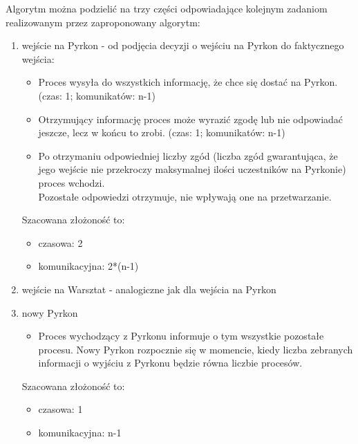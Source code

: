 \documentclass[11pt]{article}
\begin{document}
Algorytm można podzielić na trzy części odpowiadające kolejnym zadaniom realizowanym przez zaproponowany algorytm:
\begin{enumerate}
\item wejście na Pyrkon - od podjęcia decyzji o wejściu na Pyrkon do faktycznego wejścia:
\begin{itemize}
\item Proces wysyła do wszystkich informację, że chce się dostać na Pyrkon. (czas: 1; komunikatów: n-1)
\item Otrzymujący informację proces może wyrazić zgodę lub nie odpowiadać jeszcze, lecz w końcu to zrobi. (czas: 1; komunikatów: n-1)
\item Po otrzymaniu odpowiedniej liczby zgód (liczba zgód gwarantująca, że jego wejście nie przekroczy maksymalnej ilości uczestników na Pyrkonie) proces wchodzi.\\
Pozostałe odpowiedzi otrzymuje, nie wpływają one na przetwarzanie.
\end{itemize}
Szacowana złożoność to:
\begin{itemize}
\item czasowa: 2
\item komunikacyjna: 2*(n-1)
\end{itemize}
\item wejście na Warsztat - analogiczne jak dla wejścia na Pyrkon
\item nowy Pyrkon
\begin{itemize}
\item Proces wychodzący z Pyrkonu informuje o tym wszystkie pozostałe procesu. Nowy Pyrkon rozpocznie się w momencie, kiedy liczba zebranych informacji o wyjściu z Pyrkonu będzie równa liczbie procesów.
\end{itemize}
Szacowana złożoność to:
\begin{itemize}
\item czasowa: 1
\item komunikacyjna: n-1
\end{itemize}
\end{enumerate}
\end{document}

